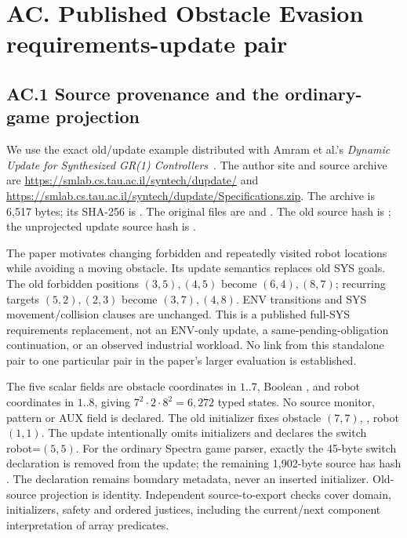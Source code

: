 \section*{AC. Published Obstacle Evasion requirements-update pair}
\subsection*{AC.1 Source provenance and the ordinary-game projection}
We use the exact old/update example distributed with Amram et al.'s
\emph{Dynamic Update for Synthesized GR(1) Controllers}~\cite{dupdate}.
The author site and source archive are
\url{https://smlab.cs.tau.ac.il/syntech/dupdate/} and
\url{https://smlab.cs.tau.ac.il/syntech/dupdate/Specifications.zip}.
The archive is 6,517 bytes; its SHA-256 is
.
The original files are
 and
.
The old source hash is
;
the unprojected update source hash is
.

The paper motivates changing forbidden and repeatedly visited robot
locations while avoiding a moving obstacle. Its update semantics replaces
old SYS goals. The old forbidden positions $(3,5),(4,5)$ become
$(6,4),(8,7)$; recurring targets $(5,2),(2,3)$ become $(3,7),(4,8)$.
ENV transitions and SYS movement/collision clauses are unchanged.
This is a published full-SYS requirements replacement, not an ENV-only
update, a same-pending-obligation continuation, or an observed industrial
workload. No link from this standalone pair to one particular pair in
the paper's larger evaluation is established.

The five scalar fields are obstacle coordinates in $1..7$, Boolean
, and robot coordinates in $1..8$, giving
$7^2\cdot2\cdot8^2=6,272$ typed states. No source monitor, pattern or AUX
field is declared. The old initializer fixes obstacle $(7,7)$,
, robot $(1,1)$. The update intentionally omits
initializers and declares the switch robot=$(5,5)$.
For the ordinary Spectra game parser, exactly the 45-byte switch declaration
is removed from the update; the remaining 1,902-byte source has hash
.
The declaration remains boundary metadata, never an inserted initializer.
Old-source projection is identity. Independent source-to-export checks
cover domain, initializers, safety and ordered justices, including the
current/next component interpretation of array predicates.

